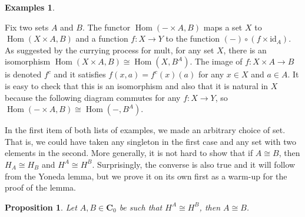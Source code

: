 \documentclass{article}
\newtheorem{prop}[thm]{Proposition}
\theoremstyle{definition}
\newtheorem{exmps}[thm]{Examples}
\theoremstyle{remark}
\DeclareMathOperator{\Hom}{Hom}
\newcommand{\id}{\text{id}}
\begin{document}
\begin{exmps}
\begin{enumerate}
		Fix two sets $A$ and $B$. The functor $\Hom(-\times A,B)$ maps a set $X$ to $\Hom(X\times A, B)$ and a function $f:X\rightarrow Y$ to the function $(-) \circ (f \times \id_A)$. As suggested by the currying process for \textsf{mult}, for any set $X$, there is an isomorphism $\Hom(X\times A,B) \cong \Hom(X, B^A)$. The image of $f:X\times A \rightarrow B$ is denoted $f^c$ and it satisfies $f(x,a) = f^c(x)(a)$ for any $x \in X$ and $a \in A$. It is easy to check that this is an isomorphism and also that it is natural in $X$ because the following diagram commutes for any $f:X\rightarrow Y$, so $\Hom(-\times A,B) \cong \Hom(-,B^A)$.
		\begin{figure}[h]
			\centering
		\end{figure}
	\end{enumerate}
\end{exmps}
In the first item of both lists of examples, we made an arbitrary choice of set. That is, we could have taken any singleton in the first case and any set with two elements in the second. More generally, it is not hard to show that if $A \cong B$, then $H_A \cong H_B$ and $H^A \cong H^B$. Surprisingly, the converse is also true and it will follow from the Yoneda lemma, but we prove it on its own first as a warm-up for the proof of the lemma.
\begin{prop}
	Let $A,B \in \mathbf{C}_0$ be such that $H^A \cong H^B$, then $A \cong B$.
\end{prop}
\end{document}
